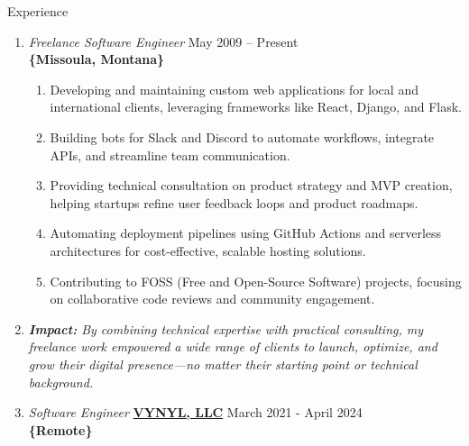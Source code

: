 \documentclass[oneside]{article}%
\begin{document}
 
\onecolumn


\renewcommand{\footrulewidth}{1pt}


\noindent
\huge{Experience}
\small
\begin{enumerate}[]
	\item \textit{Freelance Software Engineer} \hfill May 2009 -- Present\\
		\textbf{\{Missoula, Montana\}}
		\begin{enumerate}[-]
		    \item Developing and maintaining custom web applications for local and international clients, 
		          leveraging frameworks like React, Django, and Flask.
		    \item Building bots for Slack and Discord to automate workflows, integrate APIs, 
		          and streamline team communication.
		    \item Providing technical consultation on product strategy and MVP creation, helping 
		          startups refine user feedback loops and product roadmaps.
		    \item Automating deployment pipelines using GitHub Actions and serverless architectures 
		          for cost-effective, scalable hosting solutions.
		    \item Contributing to FOSS (Free and Open-Source Software) projects, focusing on 
		          collaborative code reviews and community engagement.
		\end{enumerate}
	\item \textit{\textbf{Impact:} By combining technical expertise with practical consulting, my freelance work empowered a wide range of clients to launch, optimize, and grow their digital presence—no matter their starting point or technical background.}
	\item \textit{Software Engineer} \textbf{\href{https://vynyl.com}{VYNYL, LLC}} \hfill March 2021 - April 2024\\
		\textbf{\{Remote\}}
		\begin{enumerate}[]

\end{enumerate}
\end{enumerate}
\end{document}
